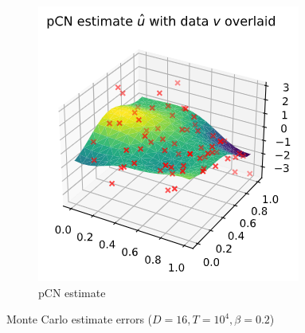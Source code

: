 \documentclass[]{article}
\begin{document}
\begin{figure}[!h]
\begin{subfigure}{0.31\linewidth}
		\includegraphics[width=\linewidth]{pcn-estimate.png}
		\caption{pCN estimate}
		\label{fig:pcn-estimate}
	\end{subfigure}
	\caption{Monte Carlo estimate errors ($D=16, T=10^4, \beta=0.2$)}
	\label{fig:u-estimate}
\end{figure}
\end{document}
